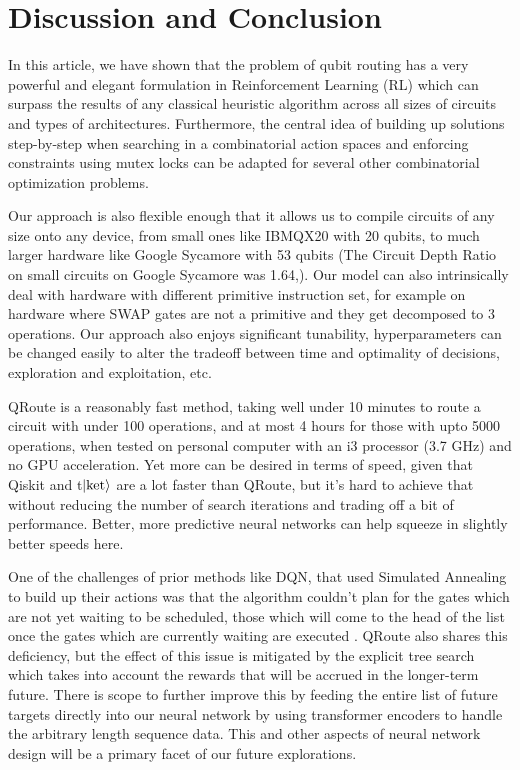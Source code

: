 \documentclass[%
 reprint,
 longbibliography,
 amsmath,amssymb,
 aps,
]{revtex4-2}
\begin{document}
\section{\label{sec:discussion-conclusion}Discussion and Conclusion}

In this article, we have shown that the problem of qubit routing has a very powerful and elegant formulation in Reinforcement Learning (RL) which can surpass the results of any classical heuristic algorithm across all sizes of circuits and types of architectures. Furthermore, the central idea of building up solutions step-by-step when searching in a combinatorial action spaces and enforcing constraints using mutex locks can be adapted for several other combinatorial optimization problems. \citep{comb_survey, comb_1, comb_2, comb_3, comb_4}

Our approach is also flexible enough that it allows us to compile circuits of any size onto any device, from small ones like IBMQX20 with 20 qubits, to much larger hardware like Google Sycamore with 53 qubits (The Circuit Depth Ratio on small circuits on Google Sycamore was 1.64,). Our model can also intrinsically deal with hardware with different primitive instruction set, for example on hardware where SWAP gates are not a primitive and they get decomposed to 3 operations. Our approach also enjoys significant tunability, hyperparameters can be changed easily to alter the tradeoff between time and optimality of decisions, exploration and exploitation, etc.

QRoute is a reasonably fast method, taking well under 10 minutes to route a circuit with under 100 operations, and at most 4 hours for those with upto 5000 operations, when tested on personal computer with an i3 processor (3.7 GHz) and no GPU acceleration. Yet more can be desired in terms of speed, given that Qiskit and t$\ket{\text{ket}}$ are a lot faster than QRoute, but it's hard to achieve that without reducing the number of search iterations and trading off a bit of performance. Better, more predictive neural networks can help squeeze in slightly better speeds here.

One of the challenges of prior methods like DQN, that used Simulated Annealing to build up their actions was that the algorithm couldn't plan for the gates which are not yet waiting to be scheduled, those which will come to the head of the list once the gates which are currently waiting are executed \citep{qroute_dqn2}. QRoute also shares this deficiency, but the effect of this issue is mitigated by the explicit tree search which takes into account the rewards that will be accrued in the longer-term future. There is scope to further improve this by feeding the entire list of future targets directly into our neural network by using transformer encoders to handle the arbitrary length sequence data. This and other aspects of neural network design will be a primary facet of our future explorations.  %
\end{document}
